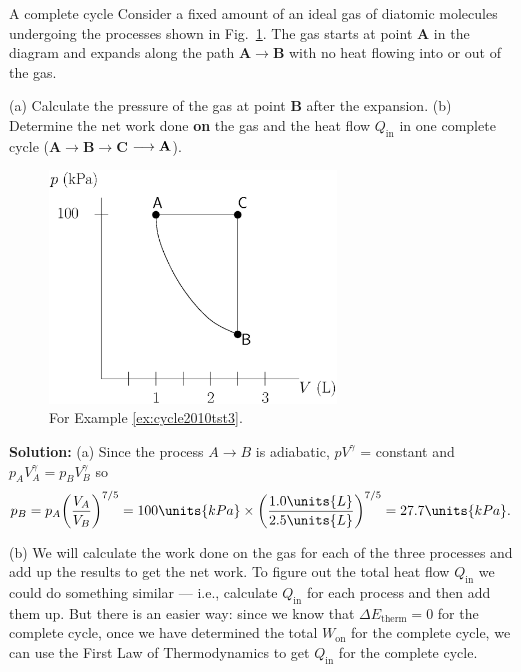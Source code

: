 \begin{example}{A complete cycle}
Consider a fixed amount of an ideal gas of diatomic molecules undergoing
the processes shown in Fig.~\ref{fig:CycleExample}.  The gas starts at
point {\bf A} in the diagram and expands along the path {\bf
  A}$\longrightarrow${\bf B} with no heat flowing into or out of the
gas.

(a) Calculate the pressure of the gas at point {\bf B} after the
expansion. (b) Determine the net work done {\bf on} the gas and the heat flow $Q_\text{in}$ 
in one complete cycle 
({\bf A}$\longrightarrow${\bf B}$\longrightarrow${\bf C}
$\longrightarrow{\bf A}$).
\begin{figure}
\begin{center}
\includegraphics[width=3.0in]{gas_processes/cycle.eps}
\caption{For Example \ref{ex:cycle2010tst3}.}
\label{fig:CycleExample}
\end{center}
\end{figure}
\label{ex:cycle2010tst3}

{\bf Solution:} (a) Since the process $A \rightarrow B$ is adiabatic,
$pV^\gamma$ = constant and $p_AV_A^\gamma = p_BV_B^\gamma$
so
\begin{equation}
  p_B = p_A\biggl(\frac{V_A}{V_B}\biggr)^{7/5} = 100
  \units{kPa} \times \biggl(\frac{1.0 \units{L}}{2.5 \units{L}}\biggr)^{7/5}
  = 27.7 \units{kPa}.
\end{equation}

(b) We will calculate the work done on the gas for each
of the three processes and add up the results to get the net work. 
To figure out the total heat flow $Q_\text{in}$ we could do something similar ---
i.e., calculate $Q_\text{in}$ for each process and then add them up. But there
is an easier way: since we know that $\Delta E_\text{therm} = 0$ for the complete
cycle, once we have determined the total $W_\text{on}$ for the complete
cycle, we can use the First Law of Thermodynamics to get $Q_\text{in}$ for
the complete cycle.


\end{example}
